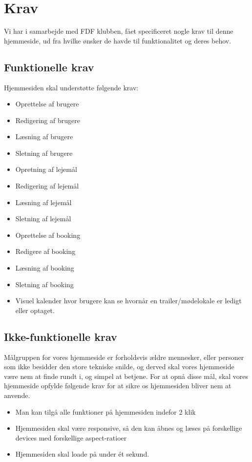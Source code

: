 \documentclass[12pt,a4paper]{report} %
\begin{document}
    \newpage
    \section{Krav}
    
    Vi har i samarbejde med FDF klubben, fået specificeret nogle krav til denne hjemmeside, ud fra hvilke ønsker de havde til funktionalitet og deres behov.
    
    \subsection*{Funktionelle krav}
    Hjemmesiden skal understøtte følgende krav:
    \begin{itemize}
        \item Oprettelse af brugere
        \item Redigering af brugere
        \item Læsning af brugere
        \item Sletning af brugere
        \item Opretning af lejemål
        \item Redigering af lejemål
        \item Læsning af lejemål
        \item Sletning af lejemål
        \item Oprettelse af booking
        \item Redigere af booking
        \item Læsning af booking
        \item Sletning af booking
        \item Visuel kalender hvor brugere kan se hvornår en trailer/mødelokale er ledigt eller optaget.
    \end{itemize}
    \newpage
    \subsection*{Ikke-funktionelle krav}
    Målgruppen for vores hjemmeside er forholdsvis ældre mennesker, eller personer som ikke besidder den store tekniske snilde, og derved skal vores hjemmeside være nem at finde rundt i, og simpel at betjene.
         For at opnå disse mål, skal vores hjemmeside opfylde følgende krav for at sikre os hjemmesiden bliver nem at anvende.
    \begin{itemize}
        \item Man kan tilgå alle funktioner på hjemmesiden indefor 2 klik
        \item Hjemmesiden skal være responsive, så den kan åbnes og læses på forskellige devices med forskellige aspect-ratioer
        \item Hjemmesiden skal loade på under ét sekund.
    \end{itemize}
        
\end{document}
